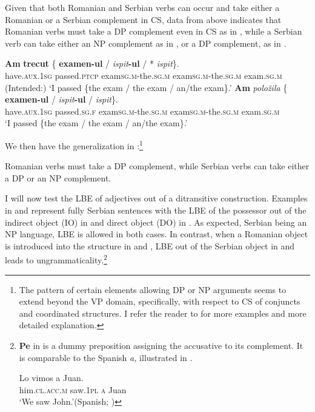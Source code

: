 \documentclass[output=paper,
hidelinks,
newtxmath,
]{langscibook}
\begin{document}
Given that both Romanian and Serbian verbs can occur and take either a Romanian or a Serbian complement in CS, data from above indicates that Romanian verbs must take a DP complement even in CS as in , while a Serbian verb can take either an NP complement as in , or a DP complement, as in .

\ea \label{ex20}
	\ea\label{ex20a}
    \gll \textbf{Am} \textbf{trecut} \{\hspace{-2pt} \textbf{examen-ul} / \textit{ispit}\textbf{-ul} /\hspace{0.1cm} *\hspace{-2pt} \textit{ispit}\hspace{1pt}\}.\\          
         have\textsc{.aux.1sg} passed\textsc{.ptcp} {} exam\textsc{sg.m}-the\textsc{.sg.m} {} exam\textsc{sg.m}-the\textsc{.sg.m} {} {} exam\textsc{.sg.m}\\
         \glt (Intended:) `I passed \{the exam / the exam / an/the exam\}.'
	\ex\label{ex20b}
    \gll \textbf{Am} \textit{položila} \{\hspace{-2pt} \textbf{examen-ul} / \textit{ispit}\textbf{-ul} / \textit{ispit}\hspace{1pt}\}.\\
         have\textsc{.aux.1sg} passed\textsc{.sg.f} {} exam\textsc{sg.m}-the\textsc{.sg.m} {} exam\textsc{sg.m}-the\textsc{.sg.m} {} exam\textsc{.sg.m}\\
         \glt `I passed \{the exam / the exam / an/the exam\}.'
	\z
\z

\noindent We then have the generalization in :\footnote{\label{fn10}The pattern of certain elements allowing DP or NP arguments seems to extend beyond the VP domain, specifically, with respect to CS of conjuncts and coordinated structures. I refer the reader to \citet{Petroj} for more examples and more detailed explanation.}

\ea\label{ex21}
  Romanian verbs must take a DP complement, while Serbian verbs can take either a DP or an NP complement.
\z

\noindent I will now test the LBE of adjectives out of a ditransitive construction. Examples in  and  represent fully Serbian sentences with the LBE of the possessor out of the indirect object (IO) in  and direct object (DO) in . As expected, Serbian being an NP language, LBE is allowed in both cases. In contrast, when a Romanian object is introduced into the structure in  and , LBE out of the Serbian object in  and  leads to ungrammaticality.\footnote{\label{fn11}\textbf{Pe} in  is a dummy preposition assigning the accusative to its complement. It is comparable to the Spanish \textit{a,} illustrated in .

\ea \gll Lo vimos a Juan.\label{fn11ex}\\
him\textsc{.cl.acc.m} saw\textsc{.1pl} \textsc{a} Juan\\
\glt `We saw John.'\hfill(Spanish; \citealt{Jaeggli1986})
\z }
\end{document}
